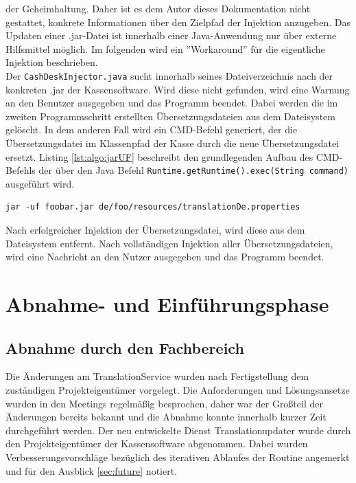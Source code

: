 \documentclass[10pt, oneside, ngerman]{article}
\begin{document}
    der Geheimhaltung. Daher ist es dem Autor dieses Dokumentation nicht gestattet, konkrete Informationen über den Zielpfad der Injektion anzugeben. 
    Das Updaten einer .jar-Datei ist innerhalb einer Java-Anwendung nur über externe Hilfsmittel möglich. Im folgenden wird ein ''Workaround'' für die eigentliche Injektion beschrieben.\\ 
    Der \lstinline{CashDeskInjector.java} sucht innerhalb seines Dateiverzeichnis nach der konkreten .jar der Kassensoftware. Wird diese nicht gefunden, wird eine Warnung an den 
    Benutzer ausgegeben und das Programm beendet. Dabei werden die im zweiten Programmschritt erstellten Übersetzungsdateien aus dem Dateisystem gelöscht. In dem anderen Fall wird ein CMD-Befehl generiert, der die Übersetzungsdatei im Klassenpfad der Kasse durch die neue Übersetzungsdatei ersetzt.
    Listing \ref{lst:algo:jarUF} beschreibt den grundlegenden Aufbau des CMD-Befehls der über den Java Befehl \lstinline{Runtime.getRuntime().exec(String command)} ausgeführt wird.
    \begin{lstlisting}[caption={Update Jar},captionpos=b,label=lst:algo:jarUF]
      jar -uf foobar.jar de/foo/resources/translationDe.properties
    \end{lstlisting}
    Nach erfolgreicher Injektion der Übersetzungsdatei, wird diese aus dem Dateisystem entfernt. Nach vollständigen Injektion aller Übersetzungsdateien, wird eine 
    Nachricht an den Nutzer ausgegeben und das Programm beendet.
  \section{Abnahme- und Einführungsphase}
  \subsection{Abnahme durch den Fachbereich}\label{sec:review}
    Die Änderungen am TranslationService wurden nach Fertigstellung dem zuständigen Projekteigentümer vorgelegt. Die Anforderungen und Lösungsansetze wurden in den Meetings 
    regelmäßig besprochen, daher war der Großteil der Änderungen bereits bekannt und die Abnahme konnte innerhalb kurzer Zeit durchgeführt werden.
    Der neu entwickelte Dienst Translationupdater wurde durch den Projekteigentümer der Kassensoftware abgenommen. Dabei wurden Verbesserungsvorschläge bezüglich des iterativen Ablaufes
    der Routine angemerkt und für den Ausblick \ref{sec:future} notiert. 
    
\end{document}
